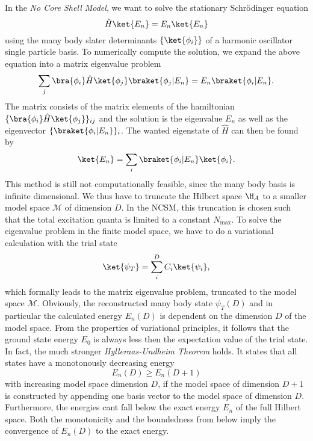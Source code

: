 In the \textit{No Core Shell Model}, we want to solve the stationary Schrödinger equation
\begin{equation}
  \label{eqn:ncsmsgl}
  \hat{H} \ket{E_n} = E_n \ket{E_n}
\end{equation}
using the many body slater determinants $\{\ket{\phi_i}\}$ of a harmonic oscillator single particle basis. To numerically compute the solution, we expand the above equation into a matrix eigenvalue problem
\begin{equation}
  \sum_j \bra{\phi_i}\hat{H}\ket{\phi_j}\braket{\phi_j | E_n} = E_n \braket{\phi_i | E_n}.
\end{equation}
The matrix consists of the matrix elements of the hamiltonian $\{\bra{\phi_i}\hat{H}\ket{\phi_j}\}_{ij}$ and the solution is the eigenvalue $E_n$ as well as the eigenvector $\{\braket{\phi_i|E_n}\}_i$. The wanted eigenstate of $\hat{H}$ can then be found by
\begin{equation}
  \ket{E_n} = \sum_i \braket{\phi_i | E_n} \ket{\phi_i}.
\end{equation}
This method is still not computationally feasible, since the many body basis is infinite dimensional. We thus have to truncate the Hilbert space $\H_A$ to a smaller model space $\mathcal{M}$ of dimension $D$. In the NCSM, this truncation is chosen such that the total excitation quanta is limited to a constant $N_{\mathrm{max}}$.
To solve the eigenvalue problem in the finite model space, we have to do a variational calculation with the trial state
\begin{equation}
  \ket{\psi_T} = \sum_i^{D} C_i \ket{\psi_i},
\end{equation}
which formally leads to the matrix eigenvalue problem, truncated to the model space $\mathcal{M}$. Obviously, the reconstructed many body state $\psi_T(D)$ and in particular the calculated energy $E_n(D)$ is dependent on the dimension $D$ of the model space. From the properties of variational principles, it follows that the ground state energy $E_0$ is always less then the expectation value of the trial state. In fact, the much stronger \textit{Hylleraas-Undheim Theorem} holds. It states that all states have a monotonously decreasing energy
\begin{equation}
  E_n(D) \geq E_n(D+1)
\end{equation}
with increasing model space dimension $D$, if the model space of dimension $D+1$ is constructed by appending one basis vector to the model space of dimension $D$. Furthermore, the energies cant fall below the exact energy $E_n$ of the full Hilbert space. Both the monotonicity and the boundedness from below imply the convergence of $E_n(D)$ to the exact energy.

